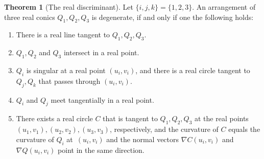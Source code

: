 \documentclass[12pt]{amsart}
\theoremstyle{definition}
\theoremstyle{definition}
\newtheorem{theorem}[thm]{Theorem}
\numberwithin{equation}{section}
\begin{document}
\begin{theorem}[The real discriminant]\label{thm:real_disc}
Let $\{ i,j,k \}  = \{1,2,3\}$.
An arrangement of three real conics $Q_1,Q_2,Q_3$ is degenerate, if and only if one the following holds:
\begin{enumerate}
\item There is a real line tangent to $Q_1,Q_2,Q_3$.
\item $Q_1,Q_2$ and $Q_3$ intersect in a real point.
\item $Q_i$ is singular at a real point $(u_i,v_i)$, and there is a real circle tangent to $Q_j,Q_k$ that passes through $(u_i,v_i)$.
\item $Q_i$ and $Q_j$ meet tangentially in a real point.
\item There exists a real circle $C$ that is tangent to $Q_1,Q_2,Q_3$ at the real points $(u_1,v_1), (u_2,v_2), (u_3,v_3)$, respectively, and the curvature of $C$ equals the curvature of $Q_i$ at~$(u_i,v_i)$ and the normal vectors $\nabla C(u_i,v_i)$ and $\nabla Q(u_i,v_i)$ point in the same direction.

\end{enumerate}
\end{theorem}
\end{document}
